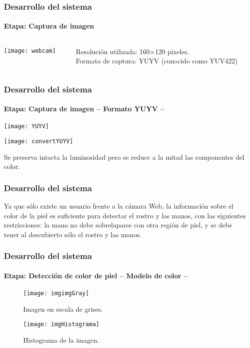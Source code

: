 \documentclass[xcolor=dvipsnames]{beamer}
\begin{document}
	\begin{frame}
		\transdissolve
		\frametitle{Desarrollo del sistema}
		\framesubtitle{Etapa: Captura de imagen}
		\begin{columns}
			\begin{column}{3cm}
				\texttt{[image: webcam]}
			\end{column}
			\begin{column}{7cm}
				Resolución utilizada: 160$\times$120 píxeles.\\
				Formato de captura: YUYV (conocido como YUV422)			
			\end{column}
		\end{columns}
	\end{frame}

	\begin{frame}
		\transdissolve
		\frametitle{Desarrollo del sistema}
		\framesubtitle{Etapa: Captura de imagen -- Formato YUYV --}
		\begin{center}
			\texttt{[image: YUYV]}
			
			\texttt{[image: convertYUYV]}
		\end{center}

		Se preserva intacta la luminosidad pero se reduce a la mitad las componentes del color.
	\end{frame}
	
	\begin{frame}
		\transdissolve
		\frametitle{Desarrollo del sistema}
		Ya que sólo existe un usuario frente a la cámara Web, la información sobre el color de la piel es suficiente para detectar el rostro y las manos, con las siguientes restricciones: la mano no debe sobrelaparse con otra región de piel, y se debe tener al descubierto sólo el rostro y las manos.
	\end{frame}

	\begin{frame}
		\transdissolve
		\frametitle{Desarrollo del sistema}
		\framesubtitle{Etapa: Detección de color de piel -- Modelo de color --}
		\begin{center}
			\begin{minipage}[c]{.45\textwidth}
				\begin{figure}[h]
					\texttt{[image: imgimgGray]}
					\caption{Imagen en escala de grises.}
				\end{figure}
			\end{minipage}
			\begin{minipage}[c]{.45\textwidth}
				\begin{figure}[h]
					\texttt{[image: imgHistograma]}
					\caption{Histograma de la imagen.}
				\end{figure}
			\end{minipage}
		\end{center}
	\end{frame}
\end{document}
